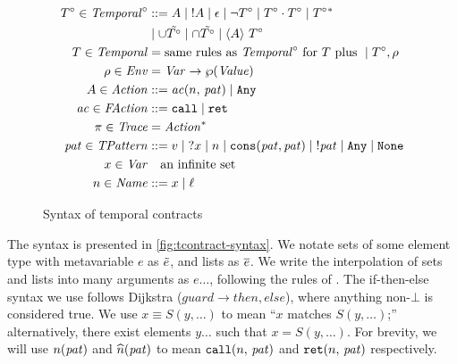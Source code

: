 \begin{figure}
  \begin{align*}
  T^\circ \in \mathit{Temporal}^\circ &::=
      A \mid {}! A
 \mid \epsilon
 \mid \neg T^\circ
 \mid T^\circ \cdot T^\circ
 \mid T^\circ{}^* \\
&\mid \cup \tilde{T^\circ}
 \mid \cap \tilde{T^\circ}
 \mid \langle A\rangle\ T^\circ
\\
T \in \mathit{Temporal} &= \text{same rules as } \mathit{Temporal}^\circ \text{ for } T \text{ plus } \mid T^\circ, \rho \\
\rho \in \mathit{Env} &= \mathit{Var} \to \wp(\mathit{Value}) \\
A \in \mathit{Action} &::= \mathit{ac}(n,\, \mathit{pat}) \mid {\tt Any} \\
\mathit{ac} \in \mathit{FAction} &::= {\tt call} \mid {\tt ret} \\
\pi \in \mathit{Trace} &= \mathit{Action}^* \\
\mathit{pat} \in \mathit{TPattern} &::= v \mid {\tt ?} x \mid n \mid {\tt cons}(\mathit{pat},\mathit{pat}) \mid {}! \mathit{pat} \mid {\tt Any} \mid {\tt None} \\
x \in \mathit{Var} &\quad\text{an infinite set} \\
n \in \mathit{Name} &::= x \mid \ell
  \end{align*}
  \caption{Syntax of temporal contracts}
  \label{fig:tcontract-syntax}
\end{figure}

%
The syntax is presented in \autoref{fig:tcontract-syntax}.
%
%
We notate sets of some element type with metavariable $e$ as $\tilde{e}$, and lists as $\overline{e}$.
%
We write the interpolation of sets and lists into many arguments as $e\ldots$, following the rules of \citet{dvanhorn:Kohlbecker1987Macrobyexample}.
%
The if-then-else syntax we use follows Dijkstra ($\mathit{guard} \to \mathit{then}, \mathit{else}$), where anything non-$\bot$ is considered true.
%
We use $x\equiv S(y,\ldots)$ to mean ``$x$ matches $S(y,\ldots)$;'' alternatively, there exist elements $y\ldots$ such that $x = S(y,\ldots)$.
%
For brevity, we will use $n(\mathit{pat})$ and $\widehat{n}(\mathit{pat})$ to mean ${\tt call}(n,\, \mathit{pat})$ and ${\tt ret}(n,\, \mathit{pat})$ respectively.

